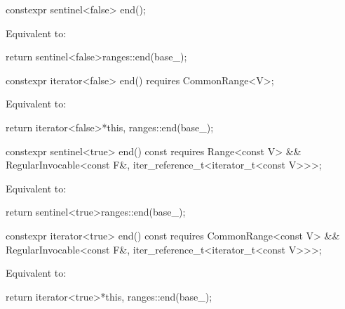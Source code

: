 %
\begin{itemdecl}
constexpr sentinel<false> end();
\end{itemdecl}

\begin{itemdescr}
\pnum
\effects Equivalent to:
\begin{codeblock}
return sentinel<false>{ranges::end(base_)};
\end{codeblock}
\end{itemdescr}

%
\begin{itemdecl}
constexpr iterator<false> end() requires CommonRange<V>;
\end{itemdecl}

\begin{itemdescr}
\pnum
\effects Equivalent to:
\begin{codeblock}
return iterator<false>{*this, ranges::end(base_)};
\end{codeblock}
\end{itemdescr}

%
\begin{itemdecl}
constexpr sentinel<true> end() const
  requires Range<const V> &&
           RegularInvocable<const F&, iter_reference_t<iterator_t<const V>>>;
\end{itemdecl}

\begin{itemdescr}
\pnum
\effects Equivalent to:
\begin{codeblock}
return sentinel<true>{ranges::end(base_)};
\end{codeblock}
\end{itemdescr}

%
\begin{itemdecl}
constexpr iterator<true> end() const
  requires CommonRange<const V> &&
           RegularInvocable<const F&, iter_reference_t<iterator_t<const V>>>;
\end{itemdecl}

\begin{itemdescr}
\pnum
\effects Equivalent to:
\begin{codeblock}
return iterator<true>{*this, ranges::end(base_)};
\end{codeblock}
\end{itemdescr}

